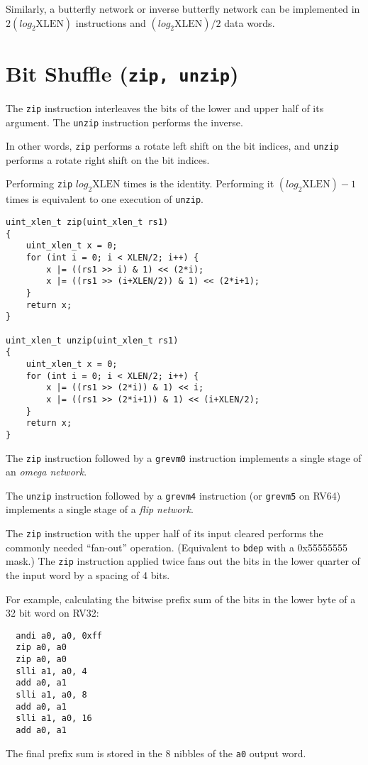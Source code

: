 Similarly, a butterfly network or inverse butterfly network can be implemented
in $2(log_2\textrm{XLEN})$ instructions and $(log_2\textrm{XLEN})/2$ data words.


\section{Bit Shuffle (\texttt{zip,\ unzip})}

The \texttt{zip} instruction interleaves the bits of the lower and upper
half of its argument. The \texttt{unzip} instruction performs the inverse.

In other words, \texttt{zip} performs a rotate left shift on the bit indices,
and \texttt{unzip} performs a rotate right shift on the bit indices.

Performing \texttt{zip} $log_2\textrm{XLEN}$ times is the identity. Performing it
$(log_2\textrm{XLEN})-1$ times is equivalent to one execution of \texttt{unzip}.

\begin{verbatim}
uint_xlen_t zip(uint_xlen_t rs1)
{
    uint_xlen_t x = 0;
    for (int i = 0; i < XLEN/2; i++) {
        x |= ((rs1 >> i) & 1) << (2*i);
        x |= ((rs1 >> (i+XLEN/2)) & 1) << (2*i+1);
    }
    return x;
}

uint_xlen_t unzip(uint_xlen_t rs1)
{
    uint_xlen_t x = 0;
    for (int i = 0; i < XLEN/2; i++) {
        x |= ((rs1 >> (2*i)) & 1) << i;
        x |= ((rs1 >> (2*i+1)) & 1) << (i+XLEN/2);
    }
    return x;
}
\end{verbatim}

The \texttt{zip} instruction followed by a \texttt{grevm0} instruction
implements a single stage of an {\it omega network}.

The \texttt{unzip} instruction followed by a \texttt{grevm4} instruction (or
\texttt{grevm5} on RV64) implements a single stage of a {\it flip network}.

The \texttt{zip} instruction with the upper half of its input cleared performs
the commonly needed ``fan-out'' operation. (Equivalent to {\tt bdep} with a
0x55555555 mask.) The \texttt{zip} instruction applied twice fans out the bits
in the lower quarter of the input word by a spacing of 4 bits.

For example, calculating the bitwise prefix sum of the bits in the lower byte
of a 32 bit word on RV32:

\begin{verbatim}
  andi a0, a0, 0xff
  zip a0, a0
  zip a0, a0
  slli a1, a0, 4
  add a0, a1
  slli a1, a0, 8
  add a0, a1
  slli a1, a0, 16
  add a0, a1
\end{verbatim}

The final prefix sum is stored in the 8 nibbles of the {\tt a0} output word.
